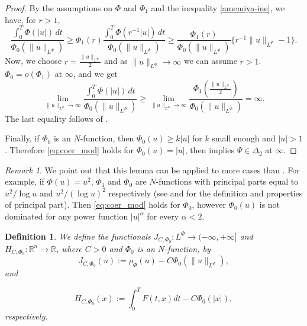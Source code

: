 \documentclass[twoside]{article}
\newtheorem{defi}[thm]{Definition}
\theoremstyle{remark}
\newtheorem{comentario}{Remark}
\newcommand{\orlnor}{\|_{L^{\Phi}}}
\newcommand{\lphi}{L^{\Phi}}
\newcommand{\rr}{\mathbb{R}}
\renewcommand{\geq}{\geqslant}
\begin{document}
\begin{proof}
By the assumptions on $\Phi$ and $\Phi_1$  and the inequality \eqref{amemiya-ine}, we have, for $r>1$,
\[
\frac{\int_0^T \Phi(|u|)\,dt}{\Phi_0(\|u\orlnor)}\geq
\Phi_1(r) \frac{\int_0^T \Phi(r^{-1}|u|)\,dt}{\Phi_0(\|u\orlnor)}\geq
\frac{\Phi_1(r)}{\Phi_0(\|u\orlnor)}\{r^{-1}\|u\orlnor-1\}.
\]
Now, we choose $r=\frac{\|u\orlnor}{2}$ and as $\|u\orlnor\to\infty$ we can assume $r>1$.
$\Phi_0=o(\Phi_1)$ at $\infty$, and  we get
\[
\lim\limits_{\|u\orlnor \to \infty} \frac{\int_0^T \Phi(|u|)\,dt}{\Phi_0(\|u\orlnor)}\geq
\lim\limits_{\|u\orlnor \to \infty} \frac{\Phi_1\left(\frac{\|u\orlnor}{2}\right)}{\Phi_0(\|u\orlnor)}
=\infty.
\]
The last equality follows of \cite[Th. 2 (b),p. 16]{rao1991theory}.



Finally, if $\Phi_0$ is an $N$-function, then $\Phi_0(u)\geq k|u|$ for  $k$ small enough and $|u|>1$. Therefore \eqref{eq:coer_mod} holds for $\Phi_0(u)=|u|$, then \cite[Lemma 5.2]{ABGMS2015}  implies  $\Psi\in\Delta_2$ at $\infty$.
\end{proof}


\begin{comentario}  We point out that this lemma can be applied to more cases than \cite[Lemma 5.2]{ABGMS2015}. For example, if $\Phi(u)=u^2$, $\Phi_1$ and $\Phi_0$ are  $N$-functions with principal parts equal to $u^2/\log u$ and $u^2/(\log u)^2$ respectively (see \cite[p. 16]{KR} and \cite[Section 7]{KR} for the definition and properties of principal part). Then  \eqref{eq:coer_mod} holds for $\Phi_0$, however $\Phi_0(u)$ is not dominated for any  power function $|u|^{\alpha}$ for every $\alpha<2$. 
\end{comentario}






\begin{defi}We define the  functionals $J_{C,\Phi_0}:\lphi\to (-\infty,+\infty]$ and $  H_{C,\Phi_0}:\rr^n\to \rr$, where $C>0$ and $\Phi_0$ is an $N$-function, by
\begin{equation}\label{func_phi}
  J_{C,\Phi_0}(u):= \rho_{\Phi}\left(u\right)-C\Phi_0\left(\|u\orlnor\right),
\end{equation}
 and

\begin{equation}\label{eq:functional_H-bis}
 H_{C,\Phi_0}(x):=\int_0^TF(t,x)dt-C\Phi_0(|x|),
\end{equation}
respectively.
\end{defi}
\end{document}
